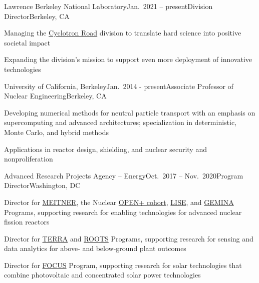 \begin{rSubsection}{Lawrence Berkeley National Laboratory}{Jan.\ 2021 -- present}{Division Director}{Berkeley, CA}
\item Managing the \href{https://www.cyclotronroad.org/}{Cyclotron Road} division to translate hard science into positive societal impact
\item Expanding the division's mission to support even more deployment of innovative technologies
\end{rSubsection}

\begin{rSubsection}{University of California, Berkeley}{Jan.\ 2014 - present}{Associate Professor of Nuclear Engineering}{Berkeley, CA}
\item Developing numerical methods for neutral particle transport with an emphasis on supercomputing and advanced architectures; specialization in deterministic, Monte Carlo, and hybrid methods
\item Applications in reactor design, shielding, and nuclear security and nonproliferation
\end{rSubsection}


\begin{rSubsection}{Advanced Research Projects Agency -- Energy}{Oct.\ 2017 -- Nov.\ 2020}{Program Director}{Washington, DC}
\item Director for
\href{https://arpa-e.energy.gov/?q=arpa-e-programs/meitner}{MEITNER}, the
Nuclear
\href{https://arpa-e.energy.gov/?q=news-item/arpa-e-announces-12-million-five-projects-nuclear-materials-science}{OPEN+
cohort},
\href{https://arpa-e.energy.gov/?q=news-item/arpa-e-innovating-through-unconventional-ideas}{LISE}, and  \href{https://arpa-e.energy.gov/technologies/programs/gemina}{GEMINA} Programs, supporting research for enabling technologies for advanced nuclear fission reactors
\item Director for \href{https://arpa-e.energy.gov/?q=arpa-e-programs/terra}{TERRA} and \href{https://arpa-e.energy.gov/?q=arpa-e-programs/roots}{ROOTS} Programs, supporting research for sensing and data analytics for above- and below-ground plant outcomes
\item Director for \href{https://arpa-e.energy.gov/?q=arpa-e-programs/focus}{FOCUS} Program, supporting research for solar technologies that combine photovoltaic and concentrated solar power technologies
\end{rSubsection}

